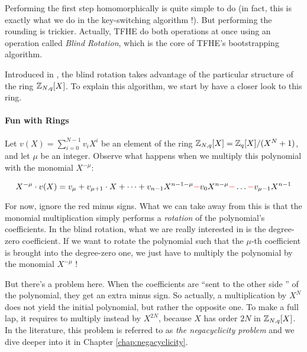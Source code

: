 Performing the first step homomorphically is quite simple to do (in fact, this is exactly what we do in the key-switching algorithm !). But performing the rounding is trickier. Actually, TFHE do both operations at once using an operation called \textit{Blind Rotation}, which is the core of TFHE's bootstrapping algorithm. 

Introduced in \cite{EC:DucMic15}, the blind rotation takes advantage of the particular structure of the ring $\mathbb{Z}_{N,q}[X]$. To explain this algorithm, we start by have a closer look to this ring.




\paragraph{Fun with Rings}

Let $v(X) = \sum_{i=0}^{N-1} v_i X^i$ be an element of the ring $\mathbb{Z}_{N,q}[X] = \mathbb{Z}_q[X] / (X^N + 1)$, and let $\mu$ be an integer. Observe what happens when we multiply this polynomial with the monomial $X^{-\mu}$:

\begin{equation*}
	X^{-\mu} \cdot v(X) = v_\mu + v_{\mu + 1} \cdot X + \dots + v_{n-1} X^{n-1-\mu} \textcolor{red}{-} v_0 X^{n - \mu} \textcolor{red}{-} \dots \textcolor{red}{-} v_{\mu - 1} X^{n-1}
\end{equation*}

For now, ignore the red minus signs. What we can take away from this is that the monomial multiplication simply performs a \textit{rotation} of the polynomial's coefficients. In the blind rotation, what we are really interested in is the degree-zero coefficient. If we want to rotate the polynomial such that the $\mu$-th coefficient is brought into the degree-zero one, we just have to multiply the polynomial by the monomial $X^{-\mu}$ !

But there's a problem here. When the coefficients are ``sent to the other side '' of the polynomial, they get an extra minus sign. So actually, a multiplication by $X^N$ does not yield the initial polynomial, but rather the opposite one. To make a full lap, it requires to multiply instead by $X^{2N}$, because $X$ has order $2N$ in $\mathbb{Z}_{N,q}[X]$. In the literature, this problem is referred to as \textit{the negacyclicity problem} and we dive deeper into it in Chapter \ref{chap:negacyclicity}.

